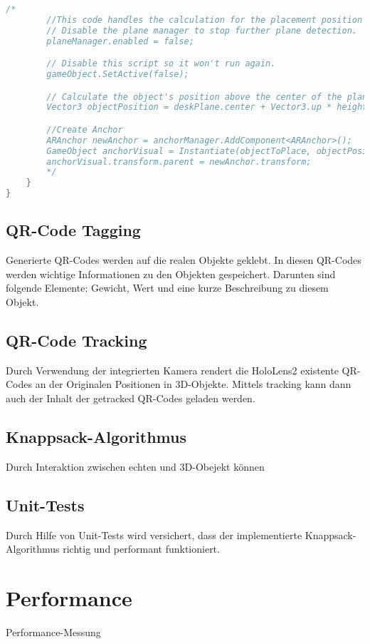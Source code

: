 \begin{lstlisting}[language=Java, style=csharpstyle, caption=3D Objekt in der echten Welt platzieren]
        /*
        //This code handles the calculation for the placement position and also attaches an ARAnchor to the placed Object
        // Disable the plane manager to stop further plane detection.
        planeManager.enabled = false;

        // Disable this script so it won't run again.
        gameObject.SetActive(false);

        // Calculate the object's position above the center of the plane.
        Vector3 objectPosition = deskPlane.center + Vector3.up * heightOffset;

        //Create Anchor
        ARAnchor newAnchor = anchorManager.AddComponent<ARAnchor>();
        GameObject anchorVisual = Instantiate(objectToPlace, objectPosition, Quaternion.identity);
        anchorVisual.transform.parent = newAnchor.transform;
        */
    }
}

\end{lstlisting}

\subsection{QR-Code Tagging}
Generierte QR-Codes werden auf die realen Objekte geklebt. In diesen QR-Codes werden
wichtige Informationen zu den Objekten gespeichert. Darunten sind folgende Elemente:
Gewicht, Wert und eine kurze Beschreibung zu diesem Objekt.

\subsection{QR-Code Tracking}
Durch Verwendung der integrierten Kamera rendert die HoloLens2 existente QR-Codes an
der Originalen Positionen in 3D-Objekte. Mittels tracking kann dann auch der Inhalt
der getracked QR-Codes geladen werden.

\subsection{Knappsack-Algorithmus}
Durch Interaktion zwischen echten und 3D-Obejekt können

\subsection{Unit-Tests}
Durch Hilfe von Unit-Tests wird versichert, dass der implementierte Knappsack-Algorithmus
richtig und performant funktioniert.

\section{Performance}
Performance-Messung

